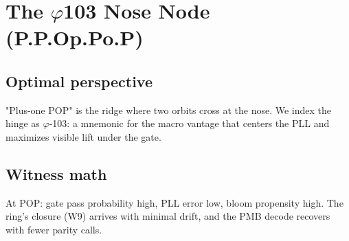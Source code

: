 \chapter{The \(\varphi\)103 Nose Node (P.P.Op.Po.P)}

\section*{Optimal perspective}
"Plus-one POP" is the ridge where two orbits cross at the nose. We index the hinge as \(\varphi\)-103:
a mnemonic for the macro vantage that centers the PLL and maximizes visible lift under the gate.

\section*{Witness math}
At POP: gate pass probability high, PLL error low, bloom propensity high. The ring's closure (W9)
arrives with minimal drift, and the PMB decode recovers with fewer parity calls.
